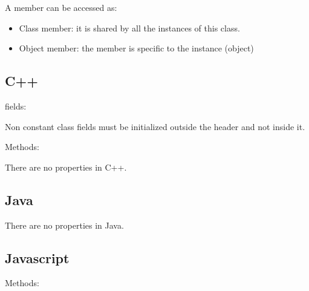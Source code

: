 \documentclass{KodeBook}
\begin{document}
A member can be accessed as: 
\begin{itemize}
	\item Class member: it is shared by all the instances of this class.
	\item Object member: the member is specific to the instance (object)
\end{itemize}


\subsection{C++}

fields: 


Non constant class fields must be initialized outside the header and not inside it. 

 

Methods:





There are no properties in C++.

\subsection{Java}





There are no properties in Java.


\subsection{Javascript}





Methods: 




\end{document}
